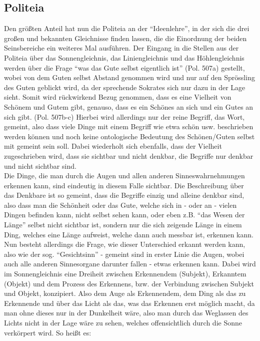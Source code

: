 \subsection{Politeia}
Den größten Anteil hat nun die Politeia an der \enquote{Ideenlehre}, in der sich die drei großen und bekannten Gleichnisse finden lassen, die die Einordnung der beiden Seinsbereiche ein weiteres Mal ausführen.
Der Eingang in die Stellen aus der Politeia über das Sonnengleichnis, das Liniengleichnis und das Höhlengleichnis werden über die Frage \enquote{was das Gute selbst eigentlich ist} (Pol. 507a) gestellt, wobei von dem Guten selbst Abstand genommen wird und nur auf den Sprössling des Guten geblickt wird, da der sprechende Sokrates sich nur dazu in der Lage sieht. Somit wird rückwirkend Bezug genommen, dass es eine Vielheit von Schönem und Gutem gibt, genauso, dass es ein Schönes an sich und ein Gutes an sich gibt. (Pol. 507b-c) Hierbei wird allerdings nur der reine Begriff, das Wort, gemeint, also dass viele Dinge mit einem Begriff wie etwa schön usw. beschrieben werden können und noch keine ontologische Bedeutung des Schönen/Guten selbst mit gemeint sein soll. Dabei wiederholt sich ebenfalls, dass der Vielheit zugeschrieben wird, dass sie sichtbar und nicht denkbar, die Begriffe nur denkbar und nicht sichtbar sind.\\
Die Dinge, die man durch die Augen und allen anderen Sinneswahrnehmungen erkennen kann, sind eindeutig in diesem Falle sichtbar. Die Beschreibung über das Denkbare ist so gemeint, dass die Begriffe einzig und alleine denkbar sind, also dass man die Schönheit oder das Gute, welche sich in - oder an - vielen Dingen befinden kann, nicht selbst sehen kann, oder eben z.B. \enquote{das Wesen der Länge} selbst nicht sichtbar ist, sondern nur die sich zeigende Länge in einem Ding, welches eine Länge aufweist, welche dann auch messbar ist, erkennen kann.
Nun besteht allerdings die Frage, wie dieser Unterschied erkannt werden kann, also wie der sog. \enquote{Gesichtsinn} - gemeint sind in erster Linie die Augen, wobei auch alle anderen Sinnesorgane darunter fallen - etwas erkennen kann.
Dabei wird im Sonnengleichnis eine Dreiheit zwischen Erkennendem (Subjekt), Erkanntem (Objekt) und dem Prozess des Erkennens, bzw. der Verbindung zwischen Subjekt und Objekt, konzipiert. Also dem Auge als Erkennendem, dem Ding als das zu Erkennende und über das Licht als das, was das Erkennen erst möglich macht, da man ohne dieses nur in der Dunkelheit wäre, also man durch das Weglassen des Lichts nicht in der Lage wäre zu sehen, welches offensichtlich durch die Sonne verkörpert wird. So heißt es:
